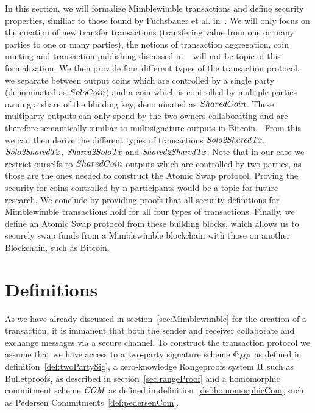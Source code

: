 In this section, we will formalize Mimblewimble transactions and define security properties, similiar to those found by Fuchsbauer et al. in~\cite{fuchsbauer2019aggregate}. We will only focus on the creation of new transfer transactions
(transfering value from one or many parties to one or many parties), the notions of transaction aggregation, coin minting and transaction publishing discussed in ~\cite{fuchsbauer2019aggregate} will not be topic of this formalization.
We then provide four different types of the transaction protocol, we separate between output coins which are controlled by a single party (denominated as $SoloCoin$) and a coin which is controlled by multiple parties owning a share of the blinding key, denominated as $SharedCoin$.
These multiparty outputs can only spend by the two owners collaborating and are therefore semantically similiar to multisignature outputs in Bitcoin.~\cite{bistarelli2018analysis}
From this we can then derive the different types of transactions $\mathit{Solo2SharedTx}$, $\mathit{Solo2SharedTx}$, $\mathit{Shared2SoloTx}$ and $\mathit{Shared2SharedTx}$.
Note that in our case we restrict ourselfs to $SharedCoin$ outputs which are controlled by two parties, as those are the ones needed to construct the Atomic Swap protocol.
Proving the security for coins controlled by n participants would be a topic for future research.
We conclude by providing proofs that all security definitions for Mimblewimble transactions hold for all four types of transactions.
Finally, we define an Atomic Swap protocol from these building blocks, which allows us to securely swap funds from a Mimblewimble blockchain with those on another Blockchain, such as Bitcoin.


\section{Definitions}\label{sec:atomic-def}

As we have already discussed in section~\ref{sec:Mimblewimble} for the creation of a transaction, it is immanent that both the sender and receiver collaborate and exchange messages via a secure channel.
To construct the transaction protocol we assume that we have access to a two-party signature scheme $\Phi_{\mathit{MP}}$ as defined in definition~\ref{def:twoPartySig}, a zero-knowledge Rangeproofs system $\Pi$
such as Bulletproofs, as described in section~\ref{sec:rangeProof} and a homomorphic commitment scheme $\mathit{COM}$ as defined in definition~\ref{def:homomorphicCom} such as
Pedersen Commitments~\ref{def:pedersenCom}.

